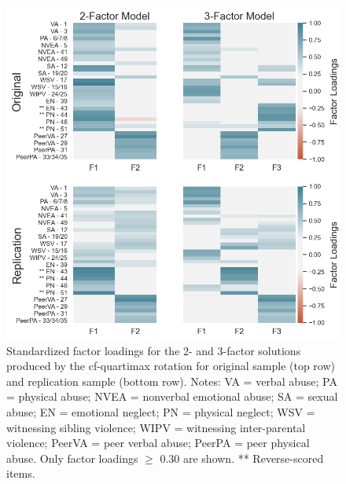 \documentclass[letterpaper,man,natbib,longtable,floatsintext,12pt]{apa6}
\begin{document}
\begin{figure}[H]
    \centering
    \includegraphics[width=1\textwidth,center]{figures/figS04.png}
    \caption{\normalfont Standardized factor loadings for the 2- and 3-factor solutions produced by the cf-quartimax rotation for original sample (top row) and replication sample (bottom row). \break \small Notes: VA = verbal abuse; PA = physical abuse; NVEA = nonverbal emotional abuse; SA = sexual abuse; EN = emotional neglect; PN = physical neglect; WSV = witnessing sibling violence; WIPV = witnessing inter-parental violence; PeerVA = peer verbal abuse; PeerPA = peer physical abuse. Only factor loadings $\geq$ 0.30 are shown. ** Reverse-scored items.}
    \label{fig:efa_cf}
\end{figure}

\pagebreak
\end{document}
